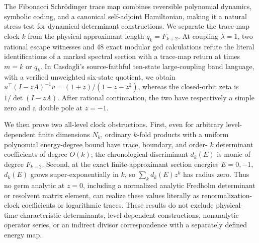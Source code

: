 The Fibonacci Schr{\"o}dinger trace map combines reversible polynomial
dynamics, symbolic coding, and a canonical self-adjoint Hamiltonian, making it
a natural stress test for dynamical-determinant constructions.  We separate
the trace-map clock \(k\) from the physical approximant length
\(q_k=F_{k+2}\).  At coupling \(\lambda=1\), two rational escape witnesses and
48 exact modular gcd calculations refute the literal identifications of a
marked spectral section with a trace-map return at times \(m=k\) or \(q_k\).
In Casdagli's source-faithful ten-state large-coupling band language, with a
verified unweighted six-state quotient, we obtain
\(u^\top(I-zA)^{-1}v=(1+z)/(1-z-z^2)\), whereas the closed-orbit zeta is
\(1/\det(I-zA)\).  After rational continuation, the two have respectively a
simple zero and a double pole at \(z=-1\).

We then prove two all-level clock obstructions.  First, even for arbitrary
level-dependent finite dimensions \(N_k\), ordinary \(k\)-fold products with
a uniform polynomial energy-degree bound have trace, boundary, and order-
\(k\) determinant coefficients of degree \(O(k)\); the chronological
discriminant \(d_k(E)\) is monic of degree \(F_{k+2}\).  Second, at the exact
finite-approximant section energies \(E=0,-1\), \(d_k(E)\) grows
super-exponentially in \(k\),
so \(\sum_k d_k(E)z^k\) has radius zero.  Thus no germ analytic at \(z=0\),
including a normalized analytic Fredholm determinant or resolvent matrix
element, can realize these values literally as renormalization-clock
coefficients or logarithmic traces.  These results do not exclude physical-
time characteristic determinants, level-dependent constructions, nonanalytic
operator series, or an indirect divisor correspondence with a separately
defined energy map.
